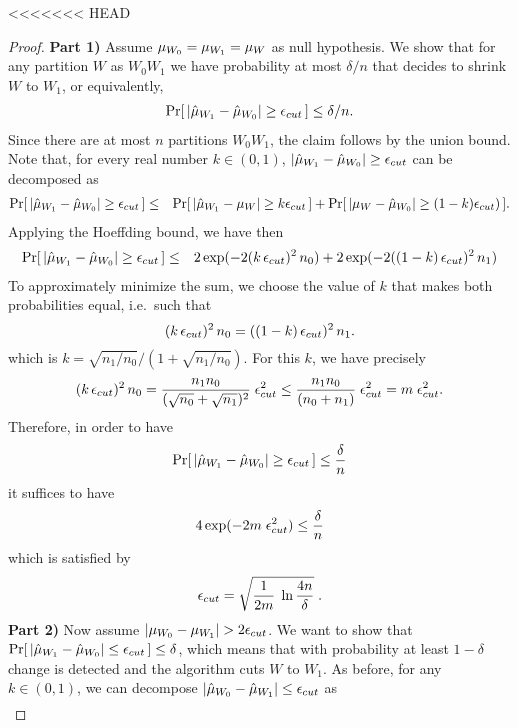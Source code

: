 <<<<<<< HEAD

\begin{proof}

{\bf{Part 1)}}
Assume ${\mu}_{W_0}={\mu}_{W_1}=\mu_W$ as null hypothesis. We show that for any partition
$W$ as $W_0W_1$ we have probability at most $\delta/n$ that \adwinz
decides to shrink $W$ to $W_1$, or equivalently,
%
\begin{eqnarray*}
\Pr [\, |\hat{\mu}_{W_1} - \hat{\mu}_{W_0}| \ge  \epsilon_{cut}\, ] \le \delta/n.
\end{eqnarray*}
%
Since there are at most $n$ partitions $W_0W_1$, the claim follows by the union bound. 
Note that, for every real number $k\in (0,1)$, $|\hat{\mu}_{W_1} - \hat{\mu}_{W_0}|\ge  \epsilon_{cut}$ 
can be decomposed as
\begin{eqnarray*}
\label{Edecomposeprobs1}
\Pr [\, |\hat{\mu}_{W_1} - \hat{\mu}_{W_0}| \ge  \epsilon_{cut} \,]
&\le& \Pr [\, |\hat{\mu}_{W_1} - \mu_W| \ge  k \epsilon_{cut} \,] + \Pr[\, |\mu_W - \hat{\mu}_{W_0}| \ge  (1-k)\epsilon_{cut} )\,].
\end{eqnarray*} 
Applying the Hoeffding bound, we have then 
\begin{eqnarray*}
\label{Edecomposeprobs2}
\Pr [\, |\hat{\mu}_{W_1} - \hat{\mu}_{W_0}| \ge  \epsilon_{cut} \,]
&\le& 2\exp(-2 (k\,\epsilon_{cut})^2 \,n_0) + 2\exp(-2 ((1-k)\,\epsilon_{cut})^2 \,n_1)
\end{eqnarray*} 
To approximately minimize the sum, we choose the value of $k$ 
that makes both probabilities equal, i.e.\ such that 
$$
(k \,\epsilon_{cut})^2 \,n_0 = ((1-k)\,\epsilon_{cut})^2 \,n_1. 
$$
which is $k=\sqrt{n_1 / n_0} / (1+\sqrt{n_1 / n_0})$. 
For this $k$, we have precisely 
$$
(k \,\epsilon_{cut})^2 \, n_0 
      = \frac{n_1 n_0}{(\sqrt{n_0}+\sqrt{n_1})^2}\; \epsilon_{cut}^2 
      \le \frac{n_1 n_0}{(n_0+n_1)} \; \epsilon_{cut}^2
      = m \; \epsilon_{cut}^2. 
$$
Therefore, in order to have 
$$
\Pr [\, |\hat{\mu}_{W_1} - \hat{\mu}_{W_0}| \ge  \epsilon_{cut} \,] \le \frac{\delta}{n}
$$
it suffices to have 
$$
4 \exp(-2m \; \epsilon_{cut}^2) \le \frac{\delta}{n}
$$
which is satisfied by 
$$
\epsilon_{cut} = \sqrt{\frac{1}{2m} \; \ln\frac{4n}{\delta}}\;.
$$
{\bf{Part 2)}}
Now assume $|\muz - \muu| > %
 2\epsc$. We want to show that
$\Pr [\, |\hat{\mu}_{W_1} - \hat{\mu}_{W_0}| \le  \epsilon_{cut} \,] \le \delta$, which means that 
with probability at least $1-\delta$ change is detected and 
the algorithm cuts $W$ to $W_1$. 
As before, for any $k\in (0,1)$, we can decompose $|\hat{\mu}_{W_0} - \hat{\mu}_{W_1}| \le  \epsilon_{cut} $ as
%
\begin{eqnarray*}

\end{eqnarray*}
\end{proof}
